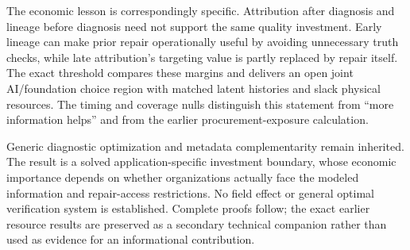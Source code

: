 \documentclass[
  11pt,
  a4paper,
]{article}
\begin{document}
The economic lesson is correspondingly specific. Attribution after
diagnosis and lineage before diagnosis need not support the same quality
investment. Early lineage can make prior repair operationally useful by
avoiding unnecessary truth checks, while late attribution's targeting
value is partly replaced by repair itself. The exact threshold compares
these margins and delivers an open joint AI/foundation choice region
with matched latent histories and slack physical resources. The timing
and coverage nulls distinguish this statement from ``more information
helps'' and from the earlier procurement-exposure calculation.

Generic diagnostic optimization and metadata complementarity remain
inherited. The result is a solved application-specific investment
boundary, whose economic importance depends on whether organizations
actually face the modeled information and repair-access restrictions. No
field effect or general optimal verification system is established.
Complete proofs follow; the exact earlier resource results are preserved
as a secondary technical companion rather than used as evidence for an
informational contribution.
\end{document}
